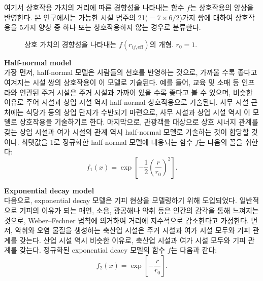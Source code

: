 \documentclass[10pt]{article}
\begin{document}
\begin{multicols}{2}
여기서 상호작용 가치의 거리에 따른 경향성을 나타내는 함수 $f$는 상호작용의 양상을 반영한다. 본 연구에서는 가능한 시설 범주의 21($= 7 \times 6 / 2$)가지 쌍에 대하여 상호작용을 5가지 양상 중 하나 또는 상호작용하지 않는 경우로 분류한다.

\begin{figure}[H]
\centering
{}
\caption{상호 가치의 경향성을 나타내는 $f(r_{ij, \text{eff}})$의 개형. $r_0 = 1$.}
\end{figure}

\textbf{Half-normal model} \\
가장 먼저, half-normal 모델은 사람들의 선호를 반영하는 것으로, 가까울 수록 좋다고 여겨지는 시설 쌍의 상호작용이 이 모델로 기술된다. 예를 들어, 교육 및 소매 등 인프라와 연관된 주거 시설은 주거 시설과 가까이 있을 수록 좋다고 볼 수 있으며, 비슷한 이유로 주어 시설과 상업 시설 역시 half-normal 상호작용으로 기술된다. 사무 시설 근처에는 식당가 등의 상업 단지가 수반되기 마련으로, 사무 시설과 상업 시설 역시 이 모델로 상호작용을 기술하기로 한다. 마지막으로, 관광객을 대상으로 상호 시너지 관계를 갖는 상업 시설과 여가 시설의 관계 역시 half-normal 모델로 기술하는 것이 합당할 것이다. 최댓값을 1로 정규화한 half-normal 모델에 대응되는 함수 $f$는 다음의 꼴을 취한다:
\begin{equation}
    f_1(x) = \exp \left[ -\frac{1}{2} \left( \frac{r}{r_0} \right)^2 \right].
\end{equation}

\textbf{Exponential decay model} \\
다음으로, exponential decay 모델은 기피 현상을 모델링하기 위해 도입되었다. 일반적으로 기피의 이유가 되는 매연, 소음, 광공해나 악취 등은 인간의 감각을 통해 느껴지는 것으로, Weber--Fechner 법칙에 의거하여 거리에 지수적으로 감소한다고 가정한다. 먼저, 악취와 오염 물질을 생성하는 축산업 시설은 주거 시설과 여가 시설 모두와 기피 관계를 갖는다. 산업 시설 역시 비슷한 이유로, 축산업 시설과 여가 시설 모두와 기피 관계를 갖는다. 정규화된 exponential deacy 모델의 함수 $f$는 다음과 같다:
\begin{equation}
    f_2(x) = \exp \left[ - \frac{r}{r_0} \right].
\end{equation}


\end{multicols}
\end{document}
